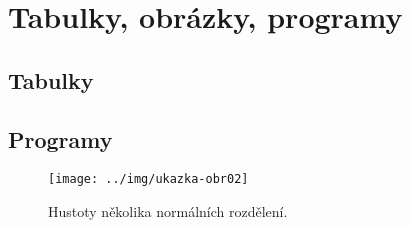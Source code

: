 \chapter{Tabulky, obrázky, programy}

\section{Tabulky}


\section{Programy}



\begin{figure}[p]\centering
\texttt{[image: ../img/ukazka-obr02]}
\caption{Hustoty několika normálních rozdělení.}
\label{obr03:Nhust}
\end{figure}